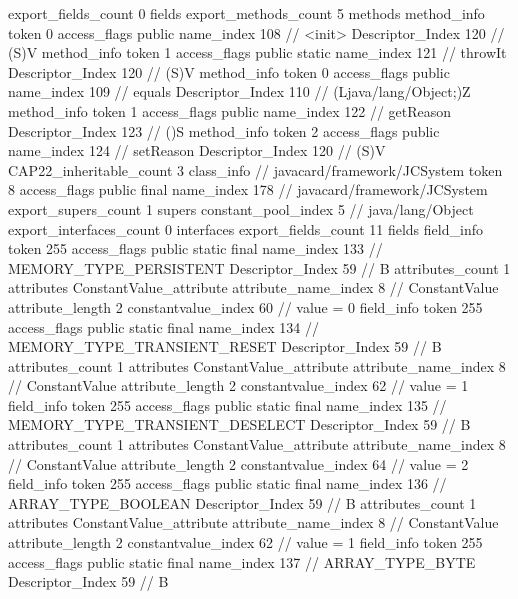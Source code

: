 {{{			export_fields_count	0
			fields {
			}
			export_methods_count	5
			methods {
				method_info {
					token	0
					access_flags	public
					name_index	108		// <init>
					Descriptor_Index	120		// (S)V
				}
				method_info {
					token	1
					access_flags	public static
					name_index	121		// throwIt
					Descriptor_Index	120		// (S)V
				}
				method_info {
					token	0
					access_flags	public
					name_index	109		// equals
					Descriptor_Index	110		// (Ljava/lang/Object;)Z
				}
				method_info {
					token	1
					access_flags	public
					name_index	122		// getReason
					Descriptor_Index	123		// ()S
				}
				method_info {
					token	2
					access_flags	public
					name_index	124		// setReason
					Descriptor_Index	120		// (S)V
				}
			}
			CAP22_inheritable_count	3
		}
		class_info {		// javacard/framework/JCSystem
			token	8
			access_flags	public final
			name_index	178		// javacard/framework/JCSystem
			export_supers_count	1
			supers {
				constant_pool_index	5		// java/lang/Object
			}
			export_interfaces_count	0
			interfaces {
			}
			export_fields_count	11
			fields {
			field_info {
				token	255
				access_flags	public static final
				name_index	133		// MEMORY_TYPE_PERSISTENT
				Descriptor_Index	59		// B
				attributes_count	1
				attributes {
				ConstantValue_attribute {
					attribute_name_index	8		// ConstantValue
					attribute_length	2
					constantvalue_index	60		// value = 0
				}
				}
			}
			field_info {
				token	255
				access_flags	public static final
				name_index	134		// MEMORY_TYPE_TRANSIENT_RESET
				Descriptor_Index	59		// B
				attributes_count	1
				attributes {
				ConstantValue_attribute {
					attribute_name_index	8		// ConstantValue
					attribute_length	2
					constantvalue_index	62		// value = 1
				}
				}
			}
			field_info {
				token	255
				access_flags	public static final
				name_index	135		// MEMORY_TYPE_TRANSIENT_DESELECT
				Descriptor_Index	59		// B
				attributes_count	1
				attributes {
				ConstantValue_attribute {
					attribute_name_index	8		// ConstantValue
					attribute_length	2
					constantvalue_index	64		// value = 2
				}
				}
			}
			field_info {
				token	255
				access_flags	public static final
				name_index	136		// ARRAY_TYPE_BOOLEAN
				Descriptor_Index	59		// B
				attributes_count	1
				attributes {
				ConstantValue_attribute {
					attribute_name_index	8		// ConstantValue
					attribute_length	2
					constantvalue_index	62		// value = 1
				}
				}
			}
			field_info {
				token	255
				access_flags	public static final
				name_index	137		// ARRAY_TYPE_BYTE
				Descriptor_Index	59		// B
}}}}}
